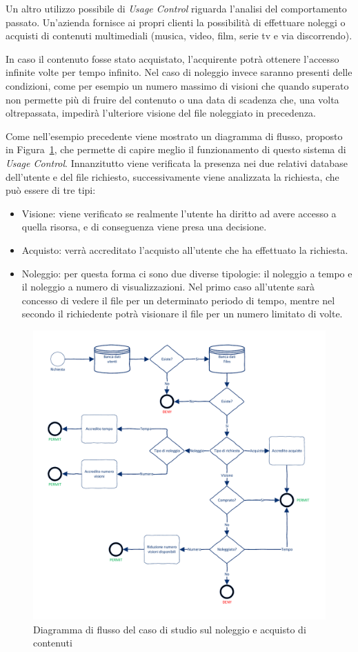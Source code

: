 Un altro utilizzo possibile di \textit{Usage Control} riguarda l'analisi del comportamento passato. Un'azienda fornisce  ai propri clienti 
la possibilità di effettuare noleggi o acquisti di contenuti multimediali (musica, video, film, serie tv e via discorrendo).\par
In caso il contenuto fosse stato acquistato, l’acquirente potrà ottenere
l’accesso infinite volte per tempo infinito. Nel caso di noleggio invece
saranno presenti delle condizioni, come per esempio un numero massimo di visioni che quando superato non permette più di fruire del contenuto o una data di scadenza che, una volta oltrepassata,
impedirà l’ulteriore visione del file noleggiato in precedenza.\par
Come nell’esempio precedente viene mostrato un diagramma di flusso,
proposto in Figura~\ref{fig:diagrammaflussosecondoesempio}, che permette di capire meglio il funzionamento di questo sistema di \textit{Usage Control}. Innanzitutto viene verificata la presenza nei due relativi database dell'utente e del file richiesto, successivamente viene analizzata la richiesta, che può essere di tre tipi:
\begin{itemize}
\item Visione: viene verificato se realmente l'utente ha diritto ad avere accesso a quella risorsa, e di conseguenza viene presa una decisione.
\item Acquisto: verrà accreditato l'acquisto all'utente che ha effettuato la richiesta.
\item Noleggio: per questa forma ci sono due diverse tipologie: il noleggio a tempo e il noleggio a numero di visualizzazioni. Nel primo caso all'utente sarà concesso di vedere il file per un determinato periodo di tempo, mentre nel secondo il richiedente potrà visionare il file per un numero limitato di volte.
\end{itemize}
\begin{figure}[h]
 \centering 
	\includegraphics[width = 1.1\textwidth]{./Visio_Project/DiagrammaFlussoSecondoEsempio.pdf}
 \caption{Diagramma di flusso del caso di studio sul noleggio e acquisto di contenuti}
 \label{fig:diagrammaflussosecondoesempio}
\end{figure}
